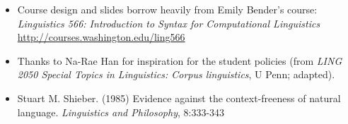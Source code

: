 \documentclass[a4paper,landscape,headrule,footrule]{foils}
\begin{document}

\begin{itemize}
\item Course design and slides borrow heavily from Emily Bender's course:
\textit{Linguistics 566: Introduction to Syntax for Computational Linguistics}
\\ \url{http://courses.washington.edu/ling566}
\item Thanks to Na-Rae Han for 
  inspiration for the student policies (from  \textit{LING 2050 Special Topics in Linguistics: Corpus linguistics}, U Penn; adapted).
\item Stuart M. Shieber. (1985) Evidence against the context-freeness of natural language. \textit{Linguistics and Philosophy}, 8:333-343
\end{itemize}
\end{document}
